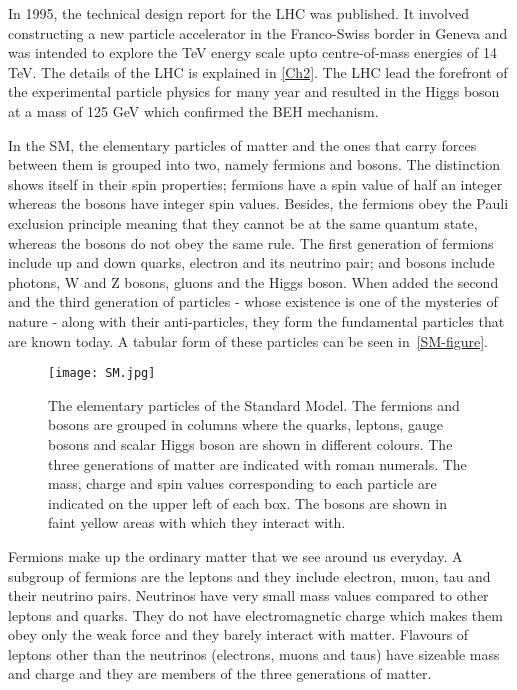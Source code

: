 In 1995, the technical design report for the LHC was published\cite{lhc-tdr}. It involved constructing a new particle accelerator in the Franco-Swiss border in Geneva and was intended to explore the TeV energy scale upto centre-of-mass energies of 14 TeV. The details of the LHC is explained in \autoref{Ch2}. The LHC lead the forefront of the experimental particle physics for many year and resulted in the Higgs boson at a mass of 125 GeV which confirmed the BEH mechanism.

In the SM, the elementary particles of matter and the ones that carry forces between them is grouped into two, namely fermions and bosons. The distinction shows itself in their spin properties; fermions have a spin value of half an integer whereas the bosons have integer spin values. Besides, the fermions obey the Pauli exclusion principle meaning that they cannot be at the same quantum state, whereas the bosons do not obey the same rule. The first generation of fermions include up and down quarks, electron and its neutrino pair; and bosons include photons, W and Z bosons, gluons and the Higgs boson. When added the second and the third generation of particles - whose existence is one of the mysteries of nature - along with their anti-particles, they form the fundamental particles that are known today. A tabular form of these particles can be seen in~\autoref{SM-figure}.

\vspace{6pt}
\begin{figure}[ht]
	\centering
	\texttt{[image: SM.jpg]}
	\vspace{6pt}
	\caption{The elementary particles of the Standard Model. The fermions and bosons are grouped in columns where the quarks, leptons, gauge bosons and scalar Higgs boson are shown in different colours. The three generations of matter are indicated with roman numerals. The mass, charge and spin values corresponding to each particle are indicated on the upper left of each box. The bosons are shown in faint yellow areas with which they interact with.}
	\label{SM-figure}
\end{figure}

Fermions make up the ordinary matter that we see around us everyday. A subgroup of fermions are the leptons and they include electron, muon, tau and their neutrino pairs. Neutrinos have very small mass values compared to other leptons and quarks. They do not have electromagnetic charge which makes them obey only the weak force and they barely interact with matter. Flavours of leptons other than the neutrinos (electrons, muons and taus) have sizeable mass and charge and they are members of the three generations of matter.

